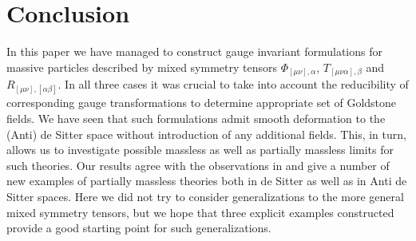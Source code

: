 \documentclass[a4paper,12pt]{article}
\begin{document}
\section*{Conclusion}

In this paper we have managed to construct gauge invariant formulations
for massive particles described by mixed symmetry tensors
$\Phi_{[\mu\nu],\alpha}$, $T_{[\mu\nu\alpha],\beta}$ and
$R_{[\mu\nu],[\alpha\beta]}$. In all three cases it was crucial
to take into account the reducibility of corresponding gauge
transformations to determine appropriate set of Goldstone fields.
We have seen that such formulations admit smooth deformation to
the (Anti) de Sitter space without introduction of any additional
fields. This, in turn, allows us to investigate possible massless
as well as partially massless limits for such theories. Our results
agree with the observations in \cite{BMV00} and give a number of
new examples of partially massless theories both in de Sitter as
well as in Anti de Sitter spaces. Here we did not try to consider
generalizations to the more general mixed symmetry tensors, but
we hope that three explicit examples constructed provide a good
starting point for such generalizations.

\newpage
\end{document}
